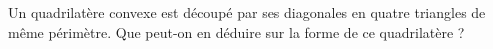 Un quadrilatère convexe est découpé par ses diagonales en quatre triangles de même périmètre. Que peut-on en déduire sur la forme de ce quadrilatère ?
